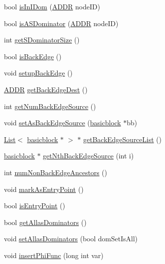\begin{DoxyCompactItemize}
\item 
bool \hyperlink{classbasicblock_a026b949adeca19875d0a8a43784d2c9d}{isInIDom} (\hyperlink{binaryTranslator_2global_8h_aa4557b0650cb21e57e3e4623410832c6}{ADDR} nodeID)
\item 
bool \hyperlink{classbasicblock_ab16dc9da49df4b6bf4c6573bfb31217a}{isASDominator} (\hyperlink{binaryTranslator_2global_8h_aa4557b0650cb21e57e3e4623410832c6}{ADDR} nodeID)
\item 
int \hyperlink{classbasicblock_ab3f5925d649492e0a3e73f4f9075ca7d}{getSDominatorSize} ()
\item 
bool \hyperlink{classbasicblock_a0da29a0f57618d2a13bfdfc9926319b9}{isBackEdge} ()
\item 
void \hyperlink{classbasicblock_a46149b611069f8c2f1328311ea4b7803}{setupBackEdge} ()
\item 
\hyperlink{binaryTranslator_2global_8h_aa4557b0650cb21e57e3e4623410832c6}{ADDR} \hyperlink{classbasicblock_a0aa9e7f9af5171d5cd4bad3503cc45c8}{getBackEdgeDest} ()
\item 
int \hyperlink{classbasicblock_a4e6b8abafbdff3155477bdefd7546ef9}{getNumBackEdgeSource} ()
\item 
void \hyperlink{classbasicblock_a26f134ff2983953107999162e764c52a}{setAsBackEdgeSource} (\hyperlink{classbasicblock}{basicblock} $\ast$bb)
\item 
\hyperlink{classList}{List}$<$ \hyperlink{classbasicblock}{basicblock} $\ast$ $>$ $\ast$ \hyperlink{classbasicblock_a20313080c67808c6db8fc8c311ba5165}{getBackEdgeSourceList} ()
\item 
\hyperlink{classbasicblock}{basicblock} $\ast$ \hyperlink{classbasicblock_a7c5a3da3287691450420e3a6cf3105b1}{getNthBackEdgeSource} (int i)
\item 
int \hyperlink{classbasicblock_ad05a1a1f24dfb10d2c637065eaea2835}{numNonBackEdgeAncestors} ()
\item 
void \hyperlink{classbasicblock_a3da24f399435a4ba33a464925d4ded05}{markAsEntryPoint} ()
\item 
bool \hyperlink{classbasicblock_a81b824d2e109bb3b9484eb021fdd0a80}{isEntryPoint} ()
\item 
bool \hyperlink{classbasicblock_ad5a6467f9a1628c658671d2f432cbeba}{getAllasDominators} ()
\item 
void \hyperlink{classbasicblock_a11c8e9c8e6e38864552bafcd041e7a08}{setAllasDominators} (bool domSetIsAll)
\item 
void \hyperlink{classbasicblock_a1aeb2fc7325b987bced690cabf8d296d}{insertPhiFunc} (long int var)

\end{DoxyCompactItemize}
